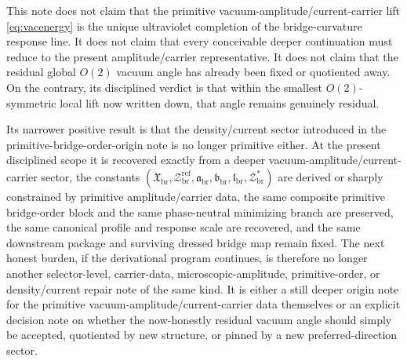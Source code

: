 \documentclass[11pt]{article}
\newcommand{\RespDeepDensityRef}{\mathcal Z_{\mathrm{br}}^{\mathrm{ref}}}
\newcommand{\RespDeepDensityEq}{\mathcal Z_{\mathrm{br}}^{\ast}}
\newcommand{\RespDeepReadout}{\mathfrak X_{\mathrm{br}}}
\newcommand{\RespDeepTrack}{\mathfrak a_{\mathrm{br}}}
\newcommand{\RespDeepRelax}{\mathfrak b_{\mathrm{br}}}
\newcommand{\RespDeepWell}{\mathfrak l_{\mathrm{br}}}
\begin{document}
This note does not claim that the primitive vacuum-amplitude/current-carrier lift \eqref{eq:vacenergy} is the unique ultraviolet completion of the bridge-curvature response line. It does not claim that every conceivable deeper continuation must reduce to the present amplitude/carrier representative. It does not claim that the residual global \(O(2)\) vacuum angle has already been fixed or quotiented away. On the contrary, its disciplined verdict is that within the smallest \(O(2)\)-symmetric local lift now written down, that angle remains genuinely residual.

Its narrower positive result is that the density/current sector introduced in the primitive-bridge-order-origin note is no longer primitive either. At the present disciplined scope it is recovered exactly from a deeper vacuum-amplitude/current-carrier sector, the constants \((\RespDeepReadout,\RespDeepDensityRef,\RespDeepTrack,\RespDeepRelax,\RespDeepWell,\RespDeepDensityEq)\) are derived or sharply constrained by primitive amplitude/carrier data, the same composite primitive bridge-order block and the same phase-neutral minimizing branch are preserved, the same canonical profile and response scale are recovered, and the same downstream package and surviving dressed bridge map remain fixed. The next honest burden, if the derivational program continues, is therefore no longer another selector-level, carrier-data, microscopic-amplitude, primitive-order, or density/current repair note of the same kind. It is either a still deeper origin note for the primitive vacuum-amplitude/current-carrier data themselves or an explicit decision note on whether the now-honestly residual vacuum angle should simply be accepted, quotiented by new structure, or pinned by a new preferred-direction sector.
\end{document}
